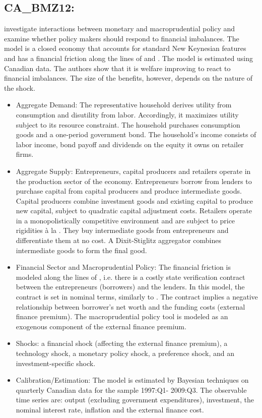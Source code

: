 \documentclass[11pt,a4paper]{article}
\begin{document}
	\subsection{CA\_BMZ12: \cite{Bailliuetal2012}}
	\label{CABMZ12} 
	\cite{Bailliuetal2012} investigate interactions between monetary and macroprudential policy and examine whether policy makers should respond to financial imbalances. The model is a closed economy that accounts for standard New Keynesian features and has a financial friction along the lines of \cite{BernankeGertlerGilchrist1999} and \cite{ChristensenDib2008}. The model is estimated using Canadian data. The authors show that it is welfare improving to react to financial imbalances. The size of the benefits, however, depends on the nature of the shock.
	\begin{itemize}
		\item Aggregate Demand: The representative household derives utility from consumption and disutility from labor. Accordingly, it maximizes utility subject to its resource constraint. The household purchases consumption goods and a one-period government bond. The household's income consists of labor income, bond payoff and dividends on the equity it owns on retailer firms. 
		\item Aggregate Supply: Entrepreneurs, capital producers and retailers operate in the production sector of the economy. Entrepreneurs borrow from lenders to purchase capital from capital producers and produce intermediate goods. Capital producers combine investment goods and existing capital to produce new capital, subject to quadratic capital adjustment costs.  Retailers operate in a monopolistically competitive environment and are subject to price rigidities \`{a}  la \cite{Calvo1983}. They buy intermediate goods from entrepreneurs and differentiate them at no cost. A Dixit-Stiglitz aggregator combines intermediate goods to form the final good. 
		\item Financial Sector and Macroprudential Policy: The financial friction is modeled along the lines of \cite{BernankeGertlerGilchrist1999}, i.e. there is a costly state verification contract between the entrepreneurs (borrowers) and the lenders. In this model, the contract is set in nominal terms, similarly to \cite{ChristensenDib2008}. The contract implies a negative relationship between borrower's net worth and the funding costs (external finance premium). The macroprudential policy tool is modeled as an exogenous component of the external finance premium. 
		\item Shocks: a financial shock (affecting the external finance premium), a technology shock, a monetary policy shock, a preference shock, and an investment-specific shock.
		\item Calibration/Estimation: The model is estimated by Bayesian techniques on quarterly Canadian data for the sample 1997:Q1- 2009:Q3. The observable time series are: output (excluding government expenditures), investment, the nominal interest rate, inflation and the external finance cost.
	\end{itemize} 
	
\end{document}
